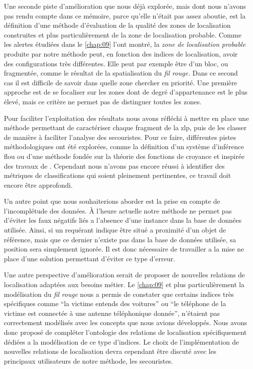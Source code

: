 Une seconde piste d'amélioration que nous déjà explorée, mais dont
nous n'avons pas rendu compte dans ce mémoire, parce qu'elle n'était
pas assez aboutie, est la définition d'une méthode d'évaluation de la
qualité des zones de localisation construites et plus particulièrement
de la zone de localisation probable. Comme les alertes étudiées dans
le \autoref{chap:09} l'ont montré, la \emph{zone de localisation
  probable} produite par notre méthode peut, en fonction des indices
de localisation, avoir des configurations très différentes. Elle peut
par exemple être d'un bloc, ou fragmentée, comme le résultat de la
spatialisation du \emph{fil rouge.} Dans ce second cas il est
difficile de savoir dans quelle zone chercher en priorité. Une
première approche est de se focaliser sur les zones dont de degré
d'appartenance est le plus élevé, mais ce critère ne permet pas de
distinguer toutes les zones.

Pour faciliter l'exploitation des résultats nous avons réfléchi à
mettre en place une méthode permettant de caractériser chaque fragment
de la \ac{zlp}, puis de les classer de manière à faciliter l'analyse
des secouristes. Pour ce faire, différentes pistes méthodologiques ont
été explorées, comme la définition d'un système d'inférence flou ou
d'une méthode fondée sur la théorie des fonctions de croyance
\autocite{Shafer1976} et inspirée des travaux de
\textcite{Olteanu2008}. Cependant nous n'avons pas encore réussi à
identifier des métriques de classifications qui soient pleinement
pertinentes, ce travail doit encore être approfondi.

Un autre point que nous souhaiterions aborder est la prise en compte
de l'incomplétude des données. À l'heure actuelle notre méthode ne
permet pas d'éviter les faux négatifs liés a l'absence d'une instance
dans la base de données utilisée. Ainsi, si un requérant indique être
situé a proximité d'un objet de référence, mais que ce dernier
n'existe pas dans la base de données utilisée, sa position sera
simplement ignorée. Il est donc nécessaire de travailler a la mise ne
place d'une solution permettant d'éviter ce type d'erreur. 

Une autre perspective d'amélioration serait de proposer de nouvelles
relations de localisation adaptées aux besoins métier. Le
\autoref{chap:09} et plus particulièrement la modélisation du
\emph{fil rouge} nous a permis de constater que certains indices très
spécifiques comme \enquote{la victime entends des voitures} ou
\enquote{le téléphone de la victime est connectée à une antenne
  téléphonique donnée}, n'étaient pas correctement modélisés avec les
concepts que nous avions développés. Nous avons donc proposé de
compléter l'ontologie des relations de localisation spécifiquement
dédiées a la modélisation de ce type d'indices. Le choix de
l'implémentation de nouvelles relations de localisation devra
cependant être discuté avec les principaux utilisateurs de notre
méthode, les secouristes.

